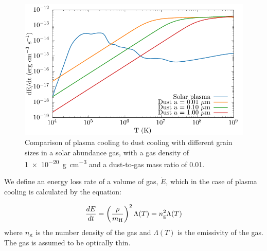 \parencite{schureNewRadiativeCooling2009}
\parencite{rybickiRadiativeProcessesAstrophysics2004}

\begin{figure}
  \centering
  \includegraphics{assets/dust-plasma-cooling-comparison/cooling-comparison.pdf}
  \caption[Dust cooling vs. plasma cooling]{Comparison of plasma cooling to dust cooling with different grain sizes in a solar abundance gas, with a gas density of \SI{1e-20}{\gram\per\centi\metre\cubed} and a dust-to-gas mass ratio of 0.01.}
  \label{fig:dustplasmacomparison}
\end{figure}


We define an energy loss rate of a volume of gas, $\dot{E}$, which in the case of plasma cooling is calculated by the equation:

\begin{equation}
  \frac{dE}{dt} = \left(\frac{\rho}{m_\text{H}}\right)^2 \Lambda(T) = n_\text{g}^2 \Lambda(T)
\end{equation}
\noindent
where $n_\text{g}$ is the number density of the gas and $\Lambda(T)$ is the emissivity of the gas.
The gas is assumed to be optically thin.


